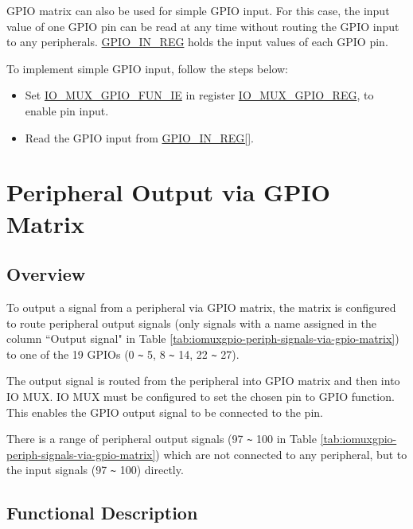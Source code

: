 \documentclass[main\_\_EN.tex]{subfiles}
\begin{document}
GPIO matrix can also be used for simple GPIO input. For this case, the input value of one GPIO pin can be read at any time without routing the GPIO input to any peripherals. \hyperref[regdesc:GPIOINREG]{GPIO\_IN\_REG} holds the input values of each GPIO pin.

To implement simple GPIO input, follow the steps below:
\begin{itemize}
    \item Set  \hyperref[fielddesc:IOMUXGPIONFUNIE]{IO\_MUX\_GPIO\_FUN\_IE} in register  \hyperref[regdesc:IOMUXGPIONREG]{IO\_MUX\_GPIO\_REG}, to enable pin input.
    \item Read the GPIO input from  \hyperref[regdesc:GPIOINREG]{GPIO\_IN\_REG[]}.
\end{itemize}

\section{Peripheral Output via GPIO Matrix}
\label{sec:peripheral-output-via-gpio-matrix}

\subsection{Overview}

To output a signal from a peripheral via GPIO matrix, the matrix is configured to route peripheral output signals (only signals with a name assigned in the column ``Output signal" in Table \ref{tab:iomuxgpio-periph-signals-via-gpio-matrix}) to one of the 19 GPIOs (0 \verb+~+ 5, 8 \verb+~+ 14, 22 \verb+~+ 27).


The output signal is routed from the peripheral into GPIO matrix and then into IO MUX. IO MUX must be configured to set the chosen pin to GPIO function. This enables the GPIO output signal to be connected to the pin.

\begin{tiplisting}
There is a range of peripheral output signals (97 \verb+~+ 100 in Table  \ref{tab:iomuxgpio-periph-signals-via-gpio-matrix}) which are not connected to any peripheral, but to the input signals (97 \verb+~+ 100) directly.
\end{tiplisting}
\vspace{-2em}


\subsection{Functional Description}\label{IOMUXPeripheralOutput}
\end{document}
